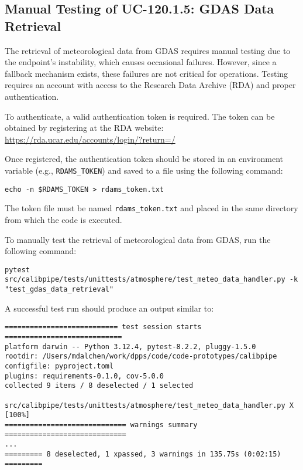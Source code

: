 \subsection{Manual Testing of UC-120.1.5: GDAS Data Retrieval}

The retrieval of meteorological data from GDAS requires manual testing due to the endpoint's instability, which causes occasional failures.
However, since a fallback mechanism exists, these failures are not critical for operations. Testing requires an account with access to the Research Data Archive (RDA) and proper authentication.

To authenticate, a valid authentication token is required. The token can be obtained by registering at the RDA website:
\url{https://rda.ucar.edu/accounts/login/?return=/}

Once registered, the authentication token should be stored in an environment variable (e.g., \texttt{RDAMS\_TOKEN}) and saved to a file using the following command:

\begin{verbatim}
echo -n $RDAMS_TOKEN > rdams_token.txt
\end{verbatim}

The token file must be named \texttt{rdams\_token.txt} and placed in the same directory from which the code is executed.

To manually test the retrieval of meteorological data from GDAS, run the following command:

\begin{verbatim}
pytest src/calibpipe/tests/unittests/atmosphere/test_meteo_data_handler.py -k "test_gdas_data_retrieval"
\end{verbatim}

A successful test run should produce an output similar to:

\begin{verbatim}
=========================== test session starts ============================
platform darwin -- Python 3.12.4, pytest-8.2.2, pluggy-1.5.0
rootdir: /Users/mdalchen/work/dpps/code/code-prototypes/calibpipe
configfile: pyproject.toml
plugins: requirements-0.1.0, cov-5.0.0
collected 9 items / 8 deselected / 1 selected

src/calibpipe/tests/unittests/atmosphere/test_meteo_data_handler.py X [100%]
============================= warnings summary =============================
...
========= 8 deselected, 1 xpassed, 3 warnings in 135.75s (0:02:15) =========
\end{verbatim}


